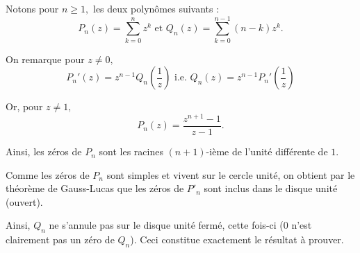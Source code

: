 Notons pour $n\geq 1,$ les deux polynômes suivants : $$P_{n}(z)=\sum_{k=0}^{n}z^{k} \mbox{ et } Q_{n}(z)=\sum_{k=0}^{n-1}(n-k)z^{k}.$$

On remarque pour $z\neq 0,$ $$P_{n}'(z)=z^{n-1}Q_{n}(\frac{1}{z}) \mbox{ i.e. } Q_{n}(z)=z^{n-1}P_{n}'(\frac{1}{z}) $$

Or, pour $z\neq 1,$ $$P_{n}(z)=\frac{z^{n+1}-1}{z-1}.$$ 

Ainsi, les zéros de $P_{n}$ sont les racines $(n+1)$-ième de l'unité différente de $1.$

Comme les zéros de $P_{n}$ sont simples et vivent sur le cercle unité, on obtient par le théorème de Gauss-Lucas que les zéros de $P'_{n}$ sont inclus dans le disque unité (ouvert).

Ainsi, $Q_{n}$ ne s'annule pas sur le disque unité fermé, cette fois-ci ($0$ n'est clairement pas un zéro de $Q_{n}$). Ceci constitue exactement le résultat à prouver.
